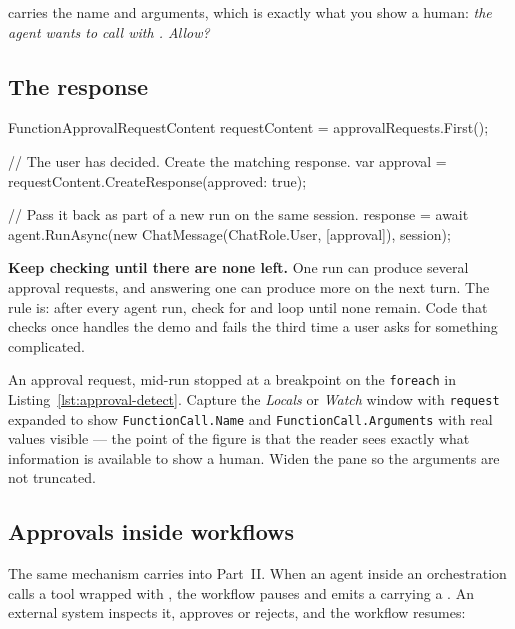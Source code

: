  carries the name and arguments,
which is exactly what you show a human: \emph{the agent wants to call
 with . Allow?}

\subsection{The response}

\begin{csharp}[caption={Approving, and continuing the run}, label={lst:approval-respond}]
FunctionApprovalRequestContent requestContent = approvalRequests.First();

// The user has decided. Create the matching response.
var approval = requestContent.CreateResponse(approved: true);

// Pass it back as part of a new run on the same session.
response = await agent.RunAsync(new ChatMessage(ChatRole.User, [approval]), session);
\end{csharp}

\begin{warning}
\textbf{Keep checking until there are none left.} One run can produce several
approval requests, and answering one can produce more on the next turn. The rule
is: after every agent run, check for  and
loop until none remain. Code that checks once handles the demo and fails the
third time a user asks for something complicated.
\end{warning}

%
{An approval request, mid-run}%
{\vsver{} stopped at a breakpoint on the \texttt{foreach} in
Listing~\ref{lst:approval-detect}. Capture the \emph{Locals} or \emph{Watch}
window with \texttt{request} expanded to show \texttt{FunctionCall.Name} and
\texttt{FunctionCall.Arguments} with real values visible --- the point of the
figure is that the reader sees exactly what information is available to show a
human. Widen the pane so the arguments are not truncated.}

\subsection{Approvals inside workflows}

The same mechanism carries into Part~II. When an agent inside an orchestration
calls a tool wrapped with , the workflow pauses
and emits a  carrying a .
An external system inspects it, approves or rejects, and the workflow resumes:


